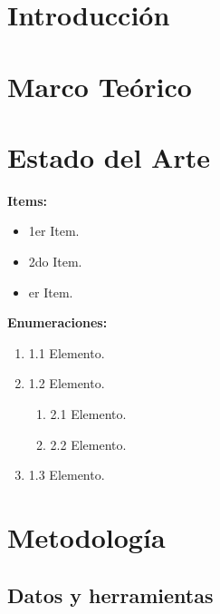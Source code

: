 \documentclass[12pt,a4paper,spanish,twoside]{article}
\begin{document}
\renewcommand{\headrulewidth}{0.4pt}
\fancyfoot[LE,RO]{\textbf{\thepage}} %

\section{Introducción}

\section{Marco Teórico}
\label{sec:2Seccion}

\section{Estado del Arte}
\label{sec:3Seccion}

\textbf{Items:}

\begin{itemize}
	\item 1er Item.
  \item 2do Item.
  \item er Item.
\end{itemize}

\textbf{Enumeraciones:}

\begin{enumerate}
	\item 1.1 Elemento.
	\item 1.2 Elemento.
  \begin{enumerate}
		\item 2.1 Elemento.
		\item 2.2 Elemento.
  \end{enumerate}
	\item 1.3 Elemento.
\end{enumerate}

\section{Metodología}
\label{sec:4Sección}

\subsection{Datos y herramientas}
\label{sec:41SubSección}
\end{document}
